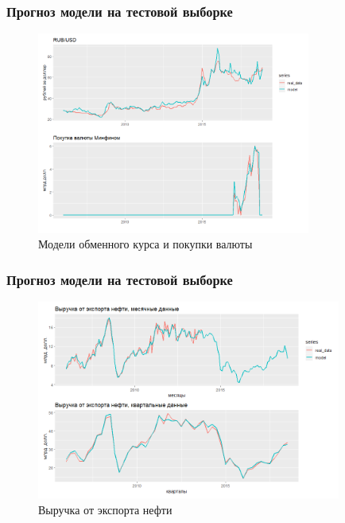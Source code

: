 \documentclass[9pt]{beamer}
\begin{document}
\begin{frame}
	\frametitle{Прогноз модели на тестовой выборке}
\begin{figure}[htp!]
	\centering
	\includegraphics[width=9cm]{rub_purch.png}
	\caption{Модели обменного курса и покупки валюты}\label{fi:5}
	\captionsetup{justification = centering, margin=0cm}
\end{figure}

\end{frame}

\begin{frame}
	\frametitle{Прогноз модели на тестовой выборке}
\begin{figure}[htp!]
	\centering
	\includegraphics[width=10cm]{oil_rev.png}
	\caption{Выручка от экспорта нефти}\label{fi:5}
	\captionsetup{justification=centering,margin=0cm}
\end{figure}
\end{frame}
\end{document}
